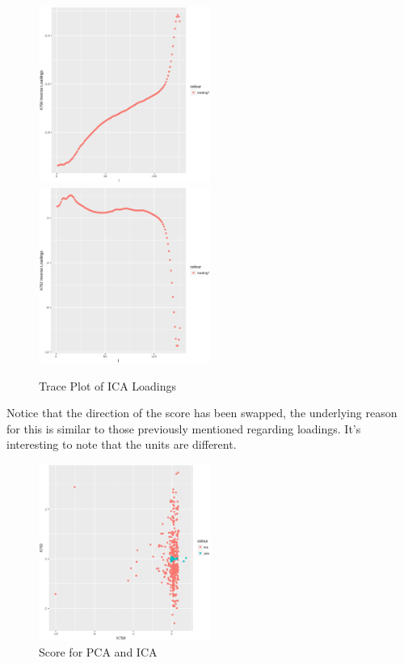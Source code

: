 \documentclass[a4paper, twocolumn]{article}
\begin{document}
        \begin{figure}[h!]
            \centering
            \caption{Trace Plot of ICA Loadings}
            \label{fig:icaloadings}
            \includegraphics[width=0.5\textwidth]{share/x750traceplot.eps}
            \includegraphics[width=0.5\textwidth]{share/x752traceplot.eps}
        \end{figure}

        Notice that the direction of the score has been swapped, the underlying reason for this is similar to those previously mentioned regarding loadings. It's interesting to note that the units are different.


        \begin{figure}[h!]
            \centering
            \caption{Score for PCA and ICA}
            \label{fig:scores}
            \includegraphics[width=0.5\textwidth]{share/icascore.eps}
        \end{figure}
\end{document}
